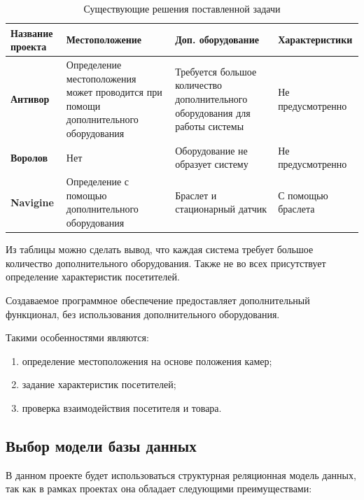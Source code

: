 \begin{table}[ht!]
	\centering
	\caption{Существующие решения поставленной задачи}
	\label{decisions}
	\begin{tabular}{|p{2.6cm}|p{4.5cm}|p{4cm}|p{4.5cm}|}
			\hline
			\textbf{Название проекта} & \textbf{Местоположение} & \textbf{Доп. оборудование} & \textbf{Характеристики}\\
			\hline
			\textbf{Антивор \cite{Antivor}} & Определение местоположения может проводится при помощи дополнительного оборудования 
			& Требуется большое количество дополнительного оборудования для работы системы
			 & Не предусмотренно\\
			\hline

			\textbf{Воролов \cite{VOROLOV}} & Нет 
			& Оборудование не образует систему
			 & Не предусмотренно\\
			\hline

			\textbf{Navigine \cite{Navigine}} & Определение с помощью дополнительного оборудования 
			& Браслет и стационарный датчик
			 & С помощью браслета\\
			\hline
	\end{tabular}
\end{table}


Из таблицы можно сделать вывод, что каждая система требует большое количество дополнительного оборудования.
Также не во всех присутствует определение характеристик посетителей.

Создаваемое программное обеспечение предоставляет дополнительный функционал, без использования дополнительного оборудования.

Такими особенностями являются:

\begin{enumerate}[label=\arabic*.]
	\item определение местоположения на основе положения камер;
	\item задание характеристик посетителей;
	\item проверка взаимодействия посетителя и товара.
\end{enumerate}

\subsection{Выбор модели базы данных}

В данном проекте будет использоваться структурная реляционная модель данных, так как в рамках проектах
она обладает следующими преимуществами:


